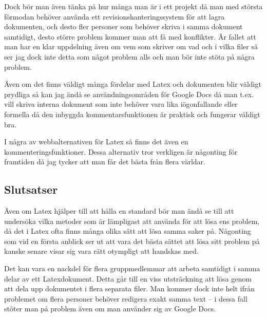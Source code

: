 Dock bör man även tänka på hur många man är i ett projekt då man med största förmodan behöver använda ett revisionshanteringssystem för att lagra dokumenten, och desto fler personer som behöver skriva i samma dokument samtidigt, desto större problem kommer man att få med konflikter. Är fallet att man har en klar uppdelning även om vem som skriver om vad och i vilka filer så ser jag dock inte detta som något problem alls och man bör inte stöta på några problem.

Även om det finns väldigt många fördelar med Latex och dokumenten blir väldigt prydliga så kan jag ändå se användningsområden för Google Docs då man t.ex. vill skriva interna dokument som inte behöver vara lika iögonfallande eller formella då den inbyggda kommentarsfunktionen är praktisk och fungerar väldigt bra.

I några av webbalternativen för Latex så finns det även en kommenteringsfunktioner. Dessa alternativ tror verkligen är någonting för framtiden då jag tycker att man får det bästa från flera världar.

\subsection{Slutsatser}
Även om Latex hjälper till att hålla en standard bör man ändå se till att undersöka vilka metoder som är lämpligast att använda för att lösa ens problem, då det i Latex ofta finns många olika sätt att lösa samma saker på. Någonting som vid en första anblick ser ut att vara det bästa sättet att lösa sitt problem på kanske senare visar sig vara rätt otympligt att handskas med.

Det kan vara en nackdel för flera gruppmedlemmar att arbeta samtidigt i samma delar av ett Latexdokument. Detta går till en viss utsträckning att lösa genom att dela upp dokumentet i flera separata filer. Man kommer dock inte helt ifrån problemet om flera personer behöver redigera exakt samma text -- i dessa fall stöter man på problem även om man använder sig av Google Docs.